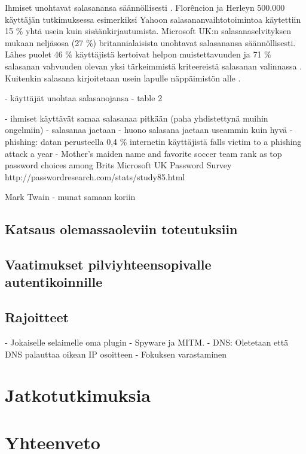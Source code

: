 \documentclass{tktltiki}
\begin{document}
Ihmiset unohtavat salasanansa säännöllisesti \cite{ponemon_pw_survey_06}. Florêncion ja Herleyn 500.000 käyttäjän tutkimuksessa \cite{study_of_passwords_07} esimerkiksi Yahoon salasananvaihtotoimintoa käytettiin 15 \% yhtä usein kuin sisäänkirjautumista. Microsoft UK:n salasanaselvityksen mukaan \cite{microsoft_pw_survey_04} neljäsosa (27 \%) britannialaisista unohtavat salasanansa säännöllisesti. Lähes puolet 46 \% käyttäjistä kertoivat helpon muistettavuuden ja 71 \% salasanan vahvuuden olevan yksi tärkeimmistä kriteereistä salasanan valinnassa \cite{symantec_pw_survey_10}. Kuitenkin salasana kirjoitetaan usein lapulle näppäimistön alle \cite{pw_auth_system_perspective_08}.



 - käyttäjät unohtaa salasanojansa
   - table 2 \cite{study_of_passwords_07} 

 - ihmiset käyttävät samaa salasanaa pitkään (paha yhdistettynä muihin ongelmiin)
 - salasanaa jaetaan
 - huono salasana jaetaan useammin kuin hyvä \cite{study_of_passwords_07}
 - phishing: datan \cite{study_of_passwords_07} perusteella 0,4 \% internetin käyttäjistä falls victim to a phishing attack a year
 - Mother's maiden name and favorite soccer team rank as top password choices among Brits
  Microsoft UK Password Survey
   http://passwordresearch.com/stats/study85.html
   
   Mark Twain - munat samaan koriin
   
\subsection{Katsaus olemassaoleviin toteutuksiin}
\subsection{Vaatimukset pilviyhteensopivalle autentikoinnille}
\subsection{Rajoitteet}
 - Jokaiselle selaimelle oma plugin
 - Spyware ja MITM. 
 - DNS: Oletetaan että DNS palauttaa oikean IP osoitteen
 - Fokuksen varastaminen
 
%   
%   
  
  
\section{Jatkotutkimuksia}
\section{Yhteenveto}





\lastpage
\end{document}
